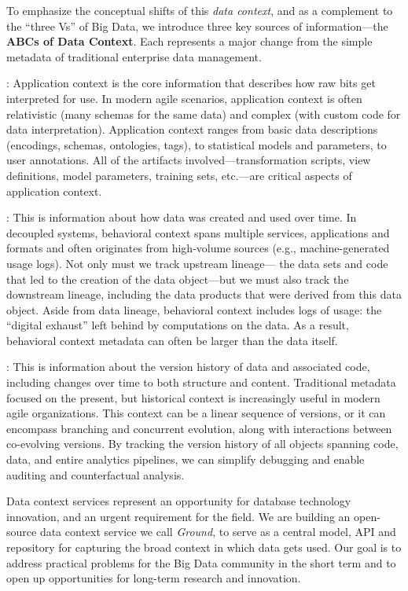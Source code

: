 \documentclass{sig-alternate}
\begin{document}
To emphasize the conceptual shifts of this \emph{data context}, and as a complement to the ``three Vs'' of Big Data,
we introduce three key sources of information---the \textbf{ABCs of Data Context}. Each represents a major change from the simple metadata of traditional enterprise data management.

: Application context is the core information that describes how raw bits get interpreted for use. 
In modern agile scenarios, application context is often relativistic (many schemas for the same data) and complex (with custom code for data interpretation). 
Application context ranges from basic data descriptions (encodings, schemas, ontologies, tags), to statistical models and parameters, to user annotations.  
All of the artifacts involved---transformation scripts, view definitions, model parameters, training sets, etc.---are critical aspects of application context. 

: This is information about how data was created and used over time. 
In decoupled systems, behavioral context spans multiple services, applications and formats and often originates from high-volume sources (e.g., machine-generated usage logs).
Not only must we track upstream lineage---
the data sets and code that led to the creation of the data object---but we must also track the 
downstream lineage, including the data products that were derived from this data object. 
Aside from data lineage, behavioral context includes logs of usage: the ``digital exhaust'' left behind by computations on the data. 
As a result, behavioral context metadata can 
often be larger than the data itself. 

:
This is information about the version history of data and associated code, including changes over time to both structure and content. 
Traditional metadata focused on the present, but historical context is increasingly useful in modern agile organizations.
This context can be a linear sequence of versions, or it can encompass branching and concurrent evolution, along with interactions 
between co-evolving versions.
By tracking the version history of all objects spanning code, data, and entire analytics pipelines, we can simplify debugging and enable auditing and counterfactual analysis. 

\smallitembot
Data context services represent an opportunity for database technology innovation, and an urgent requirement for the field.
We are building an open-source data context service we call \emph{Ground}, to serve as a central model, API and repository for capturing the broad context in which data gets used. 
Our goal is to address practical problems for the Big Data community in the short term and to open up opportunities for long-term research and innovation.
\end{document}
